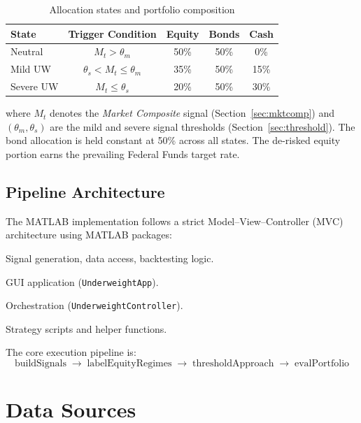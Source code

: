 \documentclass[11pt, a4paper]{article}
\begin{document}
\begin{table}[H]
\centering
\caption{Allocation states and portfolio composition}
\label{tab:alloc-states}
\begin{tabular}{lcccc}
\toprule
\textbf{State} & \textbf{Trigger Condition} & \textbf{Equity} & \textbf{Bonds} & \textbf{Cash} \\
\midrule
Neutral   & $M_t > \theta_m$                           & 50\% & 50\% & 0\%  \\
Mild UW   & $\theta_s < M_t \leq \theta_m$             & 35\% & 50\% & 15\% \\
Severe UW & $M_t \leq \theta_s$                        & 20\% & 50\% & 30\% \\
\bottomrule
\end{tabular}
\end{table}

where $M_t$ denotes the \emph{Market Composite} signal (Section~\ref{sec:mktcomp})
and $(\theta_m, \theta_s)$ are the mild and severe signal thresholds
(Section~\ref{sec:threshold}). The bond allocation is held constant at 50\%
across all states. The de-risked equity portion earns the prevailing Federal
Funds target rate.

\subsection{Pipeline Architecture}

The MATLAB implementation follows a strict
Model--View--Controller (MVC) architecture using MATLAB packages:

\begin{description}[leftmargin=3em, labelindent=1em]
  \item[\texttt{+Model/}] Signal generation, data access, backtesting logic.
  \item[\texttt{+View/}]  GUI application (\texttt{UnderweightApp}).
  \item[\texttt{+Controller/}] Orchestration (\texttt{UnderweightController}).
  \item[\texttt{Underweight/}] Strategy scripts and helper functions.
\end{description}

The core execution pipeline is:
\[
  \text{buildSignals} \;\longrightarrow\; \text{labelEquityRegimes}
  \;\longrightarrow\; \text{thresholdApproach}
  \;\longrightarrow\; \text{evalPortfolio}
\]

\section{Data Sources}
\label{sec:data}
\end{document}
